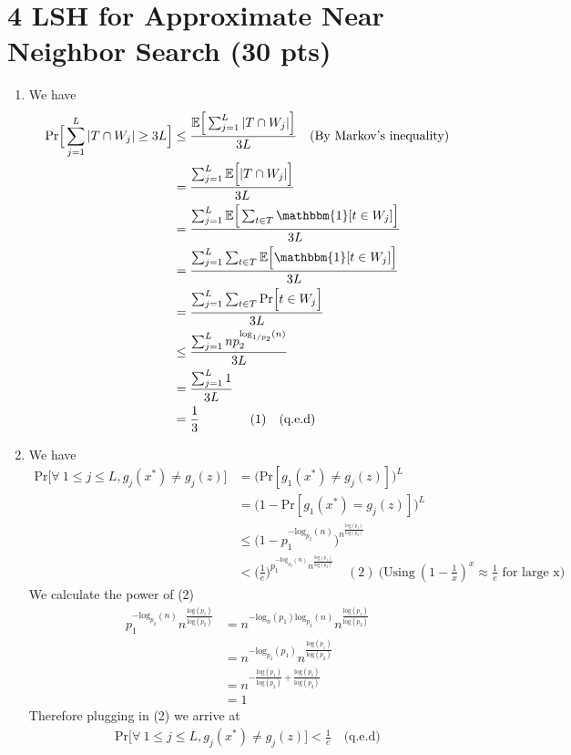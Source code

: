 \documentclass[12pt]{article}
\begin{document}
\section*{4 LSH for Approximate Near Neighbor Search (30 pts)}
\begin{enumerate}[label=(\alph*)]
	\item
	We have
	\begin{align*}
		\text{Pr}\Big[\sum_{j=1}^L|T \cap W_j| \geq 3L\Big] &\leq \frac{\mathbb{E}\Big[\sum_{j=1}^L|T \cap W_j|\Big]}{3L} \quad \text{(By Markov's inequality)}\\
		&= \frac{\sum_{j=1}^L\mathbb{E}\Big[|T \cap W_j|\Big]}{3L} \\
		&= \frac{\sum_{j=1}^L\mathbb{E}\Big[\sum_{t \in T}\mathbbm{1}[t \in W_j]\Big]}{3L} \\
		&= \frac{\sum_{j=1}^L\sum_{t \in T}\mathbb{E}\Big[\mathbbm{1}[t \in W_j]\Big]}{3L} \\
		&= \frac{\sum_{j=1}^L\sum_{t \in T}\text{Pr}\Big[t \in W_j\Big]}{3L} \\
		&\leq \frac{\sum_{j=1}^L n p_2^{\text{log}_{1/p_2}(n)}}{3L} \\ 
		&= \frac{\sum_{j=1}^L 1}{3L} \\
		&= \frac{1}{3} \qquad \qquad (1)\quad \text{(q.e.d)}
	\end{align*}

	\item
	We have
	\begin{align*}
		\text{Pr}\Big[\forall \ 1 \leq j \leq L, g_j(x^*) \neq g_j(z)\Big] &= \Big(\text{Pr}[g_1(x^*) \neq g_j(z)]\Big)^L \\
		&= \Big(1 - \text{Pr}[g_1(x^*) = g_j(z)]\Big)^L \\
		&\leq \Big(1 - p_1^{-\text{log}_{p_2}(n)}\Big)^{n^{\frac{\text{log}(p_1)}{\text{log}(p_2)}}} \\
		&< \Big(\frac{1}{e}\Big)^{p_1^{-\text{log}_{p_2}(n)}n^{\frac{\text{log}(p_1)}{\text{log}(p_2)}}} \quad (2)\ \text{(Using} \ (1 - \frac{1}{x})^x \approx \frac{1}{e} \text{ for large x)}
	\end{align*}
	We calculate the power of (2)
	\begin{align*}
		{p_1^{-\text{log}_{p_2}(n)}n^{\frac{\text{log}(p_1)}{\text{log}(p_2)}}} &= n^{-\text{log}_n(p_1)\text{log}_{p_2}(n)}n^{\frac{\text{log}(p_1)}{\text{log}(p_2)}} \\
		&= n^{-\text{log}_{p_2}(p_1)}n^{\frac{\text{log}(p_1)}{\text{log}(p_2)}} \\
		&= n^{-\frac{\text{log}(p_1)}{\text{log}(p_2)} + \frac{\text{log}(p_1)}{\text{log}(p_2)}} \\
		&= 1
	\end{align*}
	Therefore plugging in (2) we arrive at
	\begin{align*}
		\text{Pr}\Big[\forall \ 1 \leq j \leq L, g_j(x^*) \neq g_j(z)\Big] < \frac{1}{e} \quad \text{(q.e.d)}
	\end{align*}


\end{enumerate}
\end{document}
